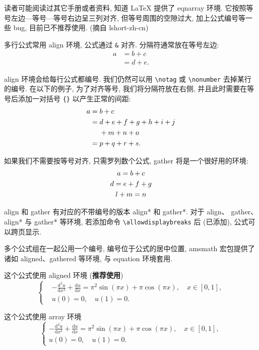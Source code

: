\documentclass[master]{shnuthesis}
\begin{document}
读者可能阅读过其它手册或者资料, 知道 LaTeX 提供了 eqnarray 环境. 它按照等号左边—等号—等号右边呈三列对齐, 但等号周围的空隙过大, 加上公式编号等一些 bug, 目前已不推荐使用. (摘自 lshort-zh-cn)

多行公式常用 align 环境, 公式通过 \verb|&| 对齐. 分隔符通常放在等号左边:
\begin{align}
a & = b + c \\
& = d + e.
\end{align}

align 环境会给每行公式都编号. 我们仍然可以用 \verb|\notag| 或 \verb|\nonumber| 去掉某行的编号. 在以下的例子,
为了对齐等号, 我们将分隔符放在右侧, 并且此时需要在等号后添加一对括号 \verb|{}| 以产生正常的间距:
\begin{align}
a ={} & b + c \\
={} & d + e + f + g + h + i + j \notag \\
& + m + n + o \\
={} & p + q + r + s.
\end{align}

如果我们不需要按等号对齐, 只需罗列数个公式, gather 将是一个很好用的环境:
\begin{gather}
a = b + c \\
d = e + f + g \notag \\
l + m = n
\end{gather}

align 和 gather 有对应的不带编号的版本 align* 和 gather*.
对于 align、 gather、align* 与 gather* 等环境, 若添加命令 \verb|\allowdisplaybreaks| 后 (已添加), 公式可以跨页显示.

多个公式组在一起公用一个编号, 编号位于公式的居中位置, amsmath 宏包提供了诸如 aligned、gathered 等环境, 与 equation 环境套用.

这个公式使用 aligned 环境 (\textbf{推荐使用})
\begin{equation}\label{eqn:1}
\left\{\begin{aligned}
  &-\frac{\mathrm{d}^{2} u}{\mathrm{d} x^{2}}+\frac{\mathrm{d} u}{\mathrm{d} x}=\pi^{2} \sin (\pi x)+\pi \cos (\pi x),\quad x \in [0,1], \\
  &u(0)=0,\quad u(1)=0.
\end{aligned} \right.
\end{equation}

这个公式使用 array 环境
\begin{equation}\label{eqn:2}
\left\{\begin{array}{l}
\displaystyle
-\frac{\mathrm{d}^{2} u}{\mathrm{d} x^{2}}+\frac{\mathrm{d} u}{\mathrm{d} x}=\pi^{2} \sin (\pi x)+\pi \cos (\pi x),\quad x \in [0,1], \\[6pt]
u(0)=0,\quad u(1)=0.
\end{array} \right.
\end{equation}
\end{document}

